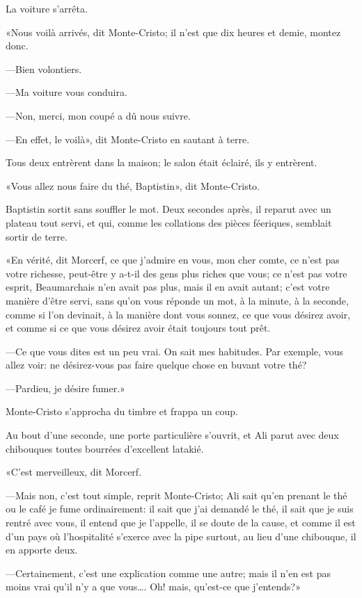 La voiture s'arrêta. 

«Nous voilà arrivés, dit Monte-Cristo; il n'est que dix heures et demie, montez donc. 

—Bien volontiers. 

—Ma voiture vous conduira. 

—Non, merci, mon coupé a dû nous suivre. 

—En effet, le voilà», dit Monte-Cristo en sautant à terre. 

Tous deux entrèrent dans la maison; le salon était éclairé, ils y entrèrent. 

«Vous allez nous faire du thé, Baptistin», dit Monte-Cristo. 

Baptistin sortit sans souffler le mot. Deux secondes après, il reparut avec un plateau tout servi, et qui, comme les collations des pièces féeriques, semblait sortir de terre. 

«En vérité, dit Morcerf, ce que j'admire en vous, mon cher comte, ce n'est pas votre richesse, peut-être y a-t-il des gens plus riches que vous; ce n'est pas votre esprit, Beaumarchais n'en avait pas plus, mais il en avait autant; c'est votre manière d'être servi, sans qu'on vous réponde un mot, à la minute, à la seconde, comme si l'on devinait, à la manière dont vous sonnez, ce que vous désirez avoir, et comme si ce que vous désirez avoir était toujours tout prêt. 

—Ce que vous dites est un peu vrai. On sait mes habitudes. Par exemple, vous allez voir: ne désirez-vous pas faire quelque chose en buvant votre thé? 

—Pardieu, je désire fumer.» 

Monte-Cristo s'approcha du timbre et frappa un coup. 

Au bout d'une seconde, une porte particulière s'ouvrit, et Ali parut avec deux chibouques toutes bourrées d'excellent latakié. 

«C'est merveilleux, dit Morcerf. 

—Mais non, c'est tout simple, reprit Monte-Cristo; Ali sait qu'en prenant le thé ou le café je fume ordinairement: il sait que j'ai demandé le thé, il sait que je suis rentré avec vous, il entend que je l'appelle, il se doute de la cause, et comme il est d'un pays où l'hospitalité s'exerce avec la pipe surtout, au lieu d'une chibouque, il en apporte deux. 

—Certainement, c'est une explication comme une autre; mais il n'en est pas moins vrai qu'il n'y a que vous\dots. Oh! mais, qu'est-ce que j'entends?» 

